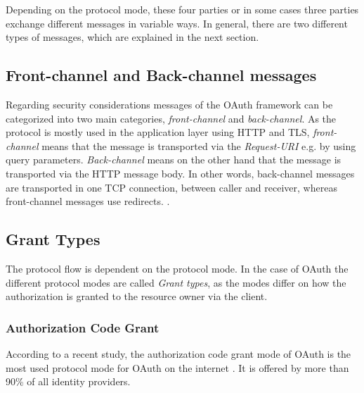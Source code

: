 \documentclass[
    fontsize=12pt,
    headings=small,
    parskip=half,           %
    bibliography=totoc,
    numbers=noenddot,       %
    open=any,               %
    ]{scrreprt}
\begin{document}
Depending on the protocol mode, these four parties or in some cases three
parties exchange different messages in variable ways. In general, there are two
different types of messages, which are explained in the next section.

\subsection{Front-channel and Back-channel messages}

Regarding security considerations messages of the OAuth framework can be
categorized into two main categories, \emph{front-channel} and
\emph{back-channel}. As the protocol is mostly used in the application layer
using HTTP and TLS, \emph{front-channel} means that the message is transported
via the \emph{Request-URI} \cite[Sec. 5.1.2]{fielding1999hypertext} e.g. by
using query parameters. \emph{Back-channel} means on the other hand that the
message is transported via the HTTP message body. In other words, back-channel
messages are transported in one TCP connection, between caller and receiver,
whereas front-channel messages use redirects. \cite[p. 338]{belfaik2022single}.

\subsection{Grant Types}
The protocol flow is dependent on the protocol mode. In the case of OAuth the
different protocol modes are called \emph{Grant types}, as the modes differ on
how the authorization is granted to the resource owner via the client.

\subsubsection{Authorization Code Grant}
According to a recent study, the authorization code grant mode of OAuth is the
most used protocol mode for OAuth on the internet
\cite[Table1]{philippaerts2022oauch}. It is offered by more than 90\% of all 
identity providers.
\end{document}
